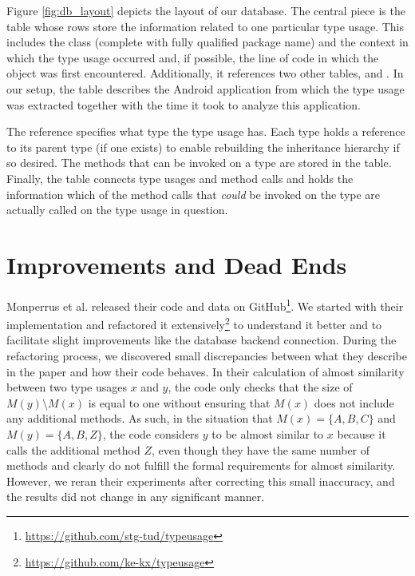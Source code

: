 Figure \ref{fig:db_layout} depicts the layout of our database.
The central piece is the  table whose rows store the information related to one particular type usage.
This includes the class (complete with fully qualified package name) and the context in which the type usage occurred and, if possible, the line of code in which the object was first encountered.
Additionally, it references two other tables,  and .
In our setup, the  table describes the Android application from which the type usage was extracted together with the time it took to analyze this application.

The  reference specifies what type the type usage has. Each type holds a reference to its parent type (if one exists) to enable rebuilding the inheritance hierarchy if so desired.
The methods that can be invoked on a type are stored in the  table.
Finally, the  table connects type usages and method calls and holds the information which of the method calls that \emph{could} be invoked on the type are actually called on the type usage in question.

\section{Improvements and Dead Ends}\label{sec:deadends}


Monperrus et al. released their code and data on GitHub\footnote{\url{https://github.com/stg-tud/typeusage}}.
We started with their implementation and refactored it extensively\footnote{\url{https://github.com/ke-kx/typeusage}} to understand it better and to facilitate slight improvements like the database backend connection.
During the refactoring process, we discovered small discrepancies between what they describe in the paper and how their code behaves.
In their calculation of almost similarity between two type usages $x$ and $y$, the code only checks that the size of $M(y) \setminus M(x)$ is equal to one without ensuring that $M(x)$ does not include any additional methods.
As such, in the situation that $M(x) =\{A, B, C\}$ and $M(y) = \{A, B, Z\}$, the code considers $y$ to be almost similar to $x$ because it calls the additional method $Z$, even though they have the same number of methods and clearly do not fulfill the formal requirements for almost similarity.
However, we reran their experiments after correcting this small inaccuracy, and the results did not change in any significant manner.

